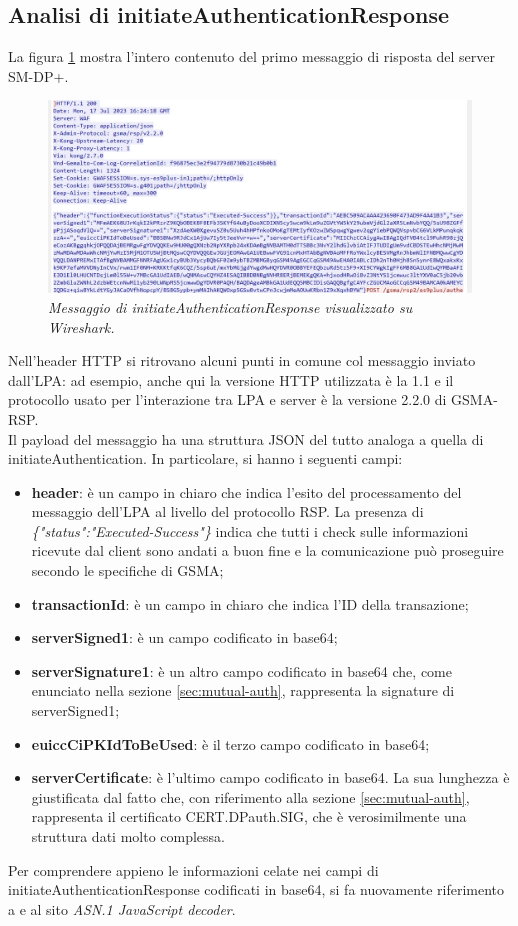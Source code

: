 \documentclass[10pt, oneside]{book}
\begin{document}
\subsection{Analisi di initiateAuthenticationResponse}
La figura \ref{fig:msg2-stream-pcap} mostra l'intero contenuto del primo messaggio di risposta del server SM-DP+.\\
\begin{figure}
\includegraphics[width=\linewidth]{msg2-stream-pcap.png}
\caption{\textit{Messaggio di initiateAuthenticationResponse visualizzato su Wireshark.}}
\label{fig:msg2-stream-pcap}
\end{figure}
Nell'header HTTP si ritrovano alcuni punti in comune col messaggio inviato dall'LPA: ad esempio, anche qui la versione HTTP utilizzata è la 1.1 e il protocollo usato per l'interazione tra LPA e server è la versione 2.2.0 di GSMA-RSP.\\

Il payload del messaggio ha una struttura JSON del tutto analoga a quella di initiateAuthentication. In particolare, si hanno i seguenti campi:
\begin{itemize}
\item \textbf{header}: è un campo in chiaro che indica l'esito del processamento del messaggio dell'LPA al livello del protocollo RSP. La presenza di \textit{\{"status":"Executed-Success"\}} indica che tutti i check sulle informazioni ricevute dal client sono andati a buon fine e la comunicazione può proseguire secondo le specifiche di GSMA;
\item \textbf{transactionId}: è un campo in chiaro che indica l'ID della transazione;
\item \textbf{serverSigned1}: è un campo codificato in base64;
\item \textbf{serverSignature1}: è un altro campo codificato in base64 che, come enunciato nella sezione \ref{sec:mutual-auth}, rappresenta la signature di serverSigned1;
\item \textbf{euiccCiPKIdToBeUsed}: è il terzo campo codificato in base64;
\item \textbf{serverCertificate}: è l'ultimo campo codificato in base64. La sua lunghezza è giustificata dal fatto che, con riferimento alla sezione \ref{sec:mutual-auth}, rappresenta il certificato CERT.DPauth.SIG, che è verosimilmente una struttura dati molto complessa.
\end{itemize}
Per comprendere appieno le informazioni celate nei campi di initiateAuthenticationResponse codificati in base64, si fa nuovamente riferimento a \cite{RSP-definitions} e al sito \textit{ASN.1 JavaScript decoder}.\\
\end{document}
